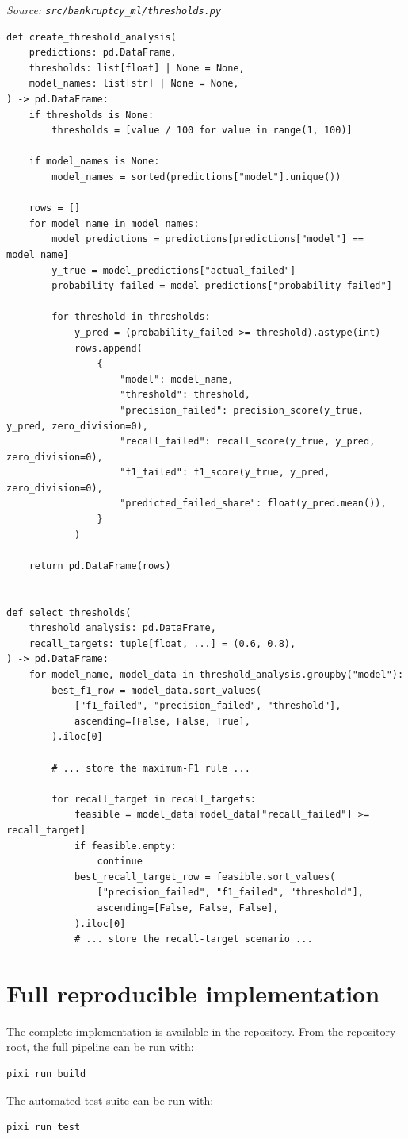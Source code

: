 \documentclass[10pt]{article}
\begin{document}
\textit{Source: \texttt{src/bankruptcy\_ml/thresholds.py}}

\begin{lstlisting}
def create_threshold_analysis(
    predictions: pd.DataFrame,
    thresholds: list[float] | None = None,
    model_names: list[str] | None = None,
) -> pd.DataFrame:
    if thresholds is None:
        thresholds = [value / 100 for value in range(1, 100)]

    if model_names is None:
        model_names = sorted(predictions["model"].unique())

    rows = []
    for model_name in model_names:
        model_predictions = predictions[predictions["model"] == model_name]
        y_true = model_predictions["actual_failed"]
        probability_failed = model_predictions["probability_failed"]

        for threshold in thresholds:
            y_pred = (probability_failed >= threshold).astype(int)
            rows.append(
                {
                    "model": model_name,
                    "threshold": threshold,
                    "precision_failed": precision_score(y_true, y_pred, zero_division=0),
                    "recall_failed": recall_score(y_true, y_pred, zero_division=0),
                    "f1_failed": f1_score(y_true, y_pred, zero_division=0),
                    "predicted_failed_share": float(y_pred.mean()),
                }
            )

    return pd.DataFrame(rows)


def select_thresholds(
    threshold_analysis: pd.DataFrame,
    recall_targets: tuple[float, ...] = (0.6, 0.8),
) -> pd.DataFrame:
    for model_name, model_data in threshold_analysis.groupby("model"):
        best_f1_row = model_data.sort_values(
            ["f1_failed", "precision_failed", "threshold"],
            ascending=[False, False, True],
        ).iloc[0]

        # ... store the maximum-F1 rule ...

        for recall_target in recall_targets:
            feasible = model_data[model_data["recall_failed"] >= recall_target]
            if feasible.empty:
                continue
            best_recall_target_row = feasible.sort_values(
                ["precision_failed", "f1_failed", "threshold"],
                ascending=[False, False, False],
            ).iloc[0]
            # ... store the recall-target scenario ...
\end{lstlisting}

\section{Full reproducible implementation}

The complete implementation is available in the repository. From the repository
root, the full pipeline can be run with:

\begin{verbatim}
pixi run build
\end{verbatim}

The automated test suite can be run with:

\begin{verbatim}
pixi run test
\end{verbatim}
\end{document}
